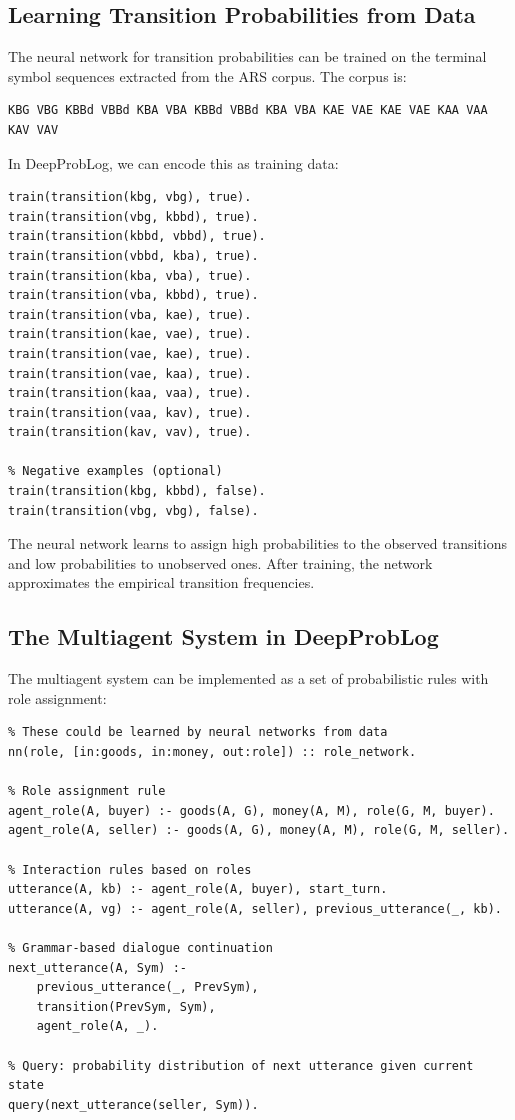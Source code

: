 \documentclass[12pt,a4paper]{article}
\begin{document}
\subsection{Learning Transition Probabilities from Data}

The neural network for transition probabilities can be trained on the terminal 
symbol sequences extracted from the ARS corpus. The corpus is:

\begin{verbatim}
KBG VBG KBBd VBBd KBA VBA KBBd VBBd KBA VBA KAE VAE KAE VAE KAA VAA KAV VAV
\end{verbatim}

In DeepProbLog, we can encode this as training data:

\begin{lstlisting}[caption=Training Data Encoding]
% Training examples: observed transitions
train(transition(kbg, vbg), true).
train(transition(vbg, kbbd), true).
train(transition(kbbd, vbbd), true).
train(transition(vbbd, kba), true).
train(transition(kba, vba), true).
train(transition(vba, kbbd), true).
train(transition(vba, kae), true).
train(transition(kae, vae), true).
train(transition(vae, kae), true).
train(transition(vae, kaa), true).
train(transition(kaa, vaa), true).
train(transition(vaa, kav), true).
train(transition(kav, vav), true).

% Negative examples (optional)
train(transition(kbg, kbbd), false).
train(transition(vbg, vbg), false).
\end{lstlisting}

The neural network learns to assign high probabilities to the observed 
transitions and low probabilities to unobserved ones. After training, 
the network approximates the empirical transition frequencies.

\subsection{The Multiagent System in DeepProbLog}

The multiagent system can be implemented as a set of probabilistic rules 
with role assignment:

\begin{lstlisting}[caption=Multiagent System in DeepProbLog]
% Agent roles based on goods and money endowments
% These could be learned by neural networks from data
nn(role, [in:goods, in:money, out:role]) :: role_network.

% Role assignment rule
agent_role(A, buyer) :- goods(A, G), money(A, M), role(G, M, buyer).
agent_role(A, seller) :- goods(A, G), money(A, M), role(G, M, seller).

% Interaction rules based on roles
utterance(A, kb) :- agent_role(A, buyer), start_turn.
utterance(A, vg) :- agent_role(A, seller), previous_utterance(_, kb).

% Grammar-based dialogue continuation
next_utterance(A, Sym) :-
    previous_utterance(_, PrevSym),
    transition(PrevSym, Sym),
    agent_role(A, _).

% Query: probability distribution of next utterance given current state
query(next_utterance(seller, Sym)).
\end{lstlisting}
\end{document}
